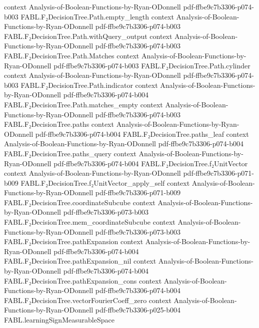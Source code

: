 \begin{theorem}
  {context}
  {Analysis-of-Boolean-Functions-by-Ryan-ODonnell}
  {pdf-ffbe9c7b3306-p074-b003}
\proofstep
  {FABL.F₂DecisionTree.Path.empty_length}
  {context}
  {Analysis-of-Boolean-Functions-by-Ryan-ODonnell}
  {pdf-ffbe9c7b3306-p074-b003}
\proofstep
  {FABL.F₂DecisionTree.Path.withQuery_output}
  {context}
  {Analysis-of-Boolean-Functions-by-Ryan-ODonnell}
  {pdf-ffbe9c7b3306-p074-b003}
\proofstep
  {FABL.F₂DecisionTree.Path.Matches}
  {context}
  {Analysis-of-Boolean-Functions-by-Ryan-ODonnell}
  {pdf-ffbe9c7b3306-p074-b003}
\proofstep
  {FABL.F₂DecisionTree.Path.cylinder}
  {context}
  {Analysis-of-Boolean-Functions-by-Ryan-ODonnell}
  {pdf-ffbe9c7b3306-p074-b003}
\proofstep
  {FABL.F₂DecisionTree.Path.indicator}
  {context}
  {Analysis-of-Boolean-Functions-by-Ryan-ODonnell}
  {pdf-ffbe9c7b3306-p074-b004}
\proofstep
  {FABL.F₂DecisionTree.Path.matches_empty}
  {context}
  {Analysis-of-Boolean-Functions-by-Ryan-ODonnell}
  {pdf-ffbe9c7b3306-p074-b003}
\proofstep
  {FABL.F₂DecisionTree.paths}
  {context}
  {Analysis-of-Boolean-Functions-by-Ryan-ODonnell}
  {pdf-ffbe9c7b3306-p074-b004}
\proofstep
  {FABL.F₂DecisionTree.paths_leaf}
  {context}
  {Analysis-of-Boolean-Functions-by-Ryan-ODonnell}
  {pdf-ffbe9c7b3306-p074-b004}
\proofstep
  {FABL.F₂DecisionTree.paths_query}
  {context}
  {Analysis-of-Boolean-Functions-by-Ryan-ODonnell}
  {pdf-ffbe9c7b3306-p074-b004}
\proofstep
  {FABL.F₂DecisionTree.f₂UnitVector}
  {context}
  {Analysis-of-Boolean-Functions-by-Ryan-ODonnell}
  {pdf-ffbe9c7b3306-p071-b009}
\proofstep
  {FABL.F₂DecisionTree.f₂UnitVector_apply_self}
  {context}
  {Analysis-of-Boolean-Functions-by-Ryan-ODonnell}
  {pdf-ffbe9c7b3306-p071-b009}
\proofstep
  {FABL.F₂DecisionTree.coordinateSubcube}
  {context}
  {Analysis-of-Boolean-Functions-by-Ryan-ODonnell}
  {pdf-ffbe9c7b3306-p073-b003}
\proofstep
  {FABL.F₂DecisionTree.mem_coordinateSubcube}
  {context}
  {Analysis-of-Boolean-Functions-by-Ryan-ODonnell}
  {pdf-ffbe9c7b3306-p073-b003}
\proofstep
  {FABL.F₂DecisionTree.pathExpansion}
  {context}
  {Analysis-of-Boolean-Functions-by-Ryan-ODonnell}
  {pdf-ffbe9c7b3306-p074-b004}
\proofstep
  {FABL.F₂DecisionTree.pathExpansion_nil}
  {context}
  {Analysis-of-Boolean-Functions-by-Ryan-ODonnell}
  {pdf-ffbe9c7b3306-p074-b004}
\proofstep
  {FABL.F₂DecisionTree.pathExpansion_cons}
  {context}
  {Analysis-of-Boolean-Functions-by-Ryan-ODonnell}
  {pdf-ffbe9c7b3306-p074-b004}
\proofstep
  {FABL.F₂DecisionTree.vectorFourierCoeff_zero}
  {context}
  {Analysis-of-Boolean-Functions-by-Ryan-ODonnell}
  {pdf-ffbe9c7b3306-p025-b004}
\proofstep
  {FABL.learningSignMeasurableSpace}

\end{theorem}
